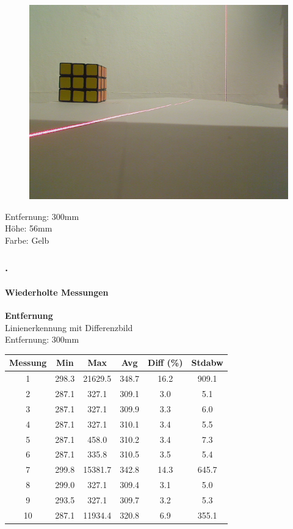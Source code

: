 \documentclass[xcolor=dvipsnames]{beamer}
\def\frametitlesec{\frametitle{\arabic{section}.\hspace{0.5ex}\insertsection}}
\def\framesubtitles#1{\framesubtitle{\hspace{3.5ex}#1}}
\begin{document}
\begin{frame}
\begin{figure}
\begin{minipage}{0.32\linewidth}
		\end{minipage}
		\hfill
		\begin{minipage}{0.32\linewidth}
			\includegraphics[width=\linewidth]{includes/test_repeat_3}
		\end{minipage}
	\end{figure}
	
	Entfernung: 300mm\\
	Höhe: 56mm\\
	Farbe: Gelb

\end{frame}
	
\begin{frame}
	\frametitlesec
	\framesubtitles{Wiederholte Messungen}
		\textbf{Entfernung}\\
	
		Linienerkennung mit Differenzbild\\
		Entfernung: 300mm
		
		\begin{tabular}{c|c|c|c|c|c}
			Messung & Min & Max & Avg & Diff (\%) & Stdabw \\ \hline
1 & 298.3 & 21629.5 & 348.7 & 16.2 & 909.1 \\
2 & 287.1 & 327.1 & 309.1 & 3.0 & 5.1 \\
3 & 287.1 & 327.1 & 309.9 & 3.3 & 6.0 \\
4 & 287.1 & 327.1 & 310.1 & 3.4 & 5.5 \\
5 & 287.1 & 458.0 & 310.2 & 3.4 & 7.3 \\
6 & 287.1 & 335.8 & 310.5 & 3.5 & 5.4 \\
7 & 299.8 & 15381.7 & 342.8 & 14.3 & 645.7 \\
8 & 299.0 & 327.1 & 309.4 & 3.1 & 5.0 \\
9 & 293.5 & 327.1 & 309.7 & 3.2 & 5.3 \\
10 & 287.1 & 11934.4 & 320.8 & 6.9 & 355.1
		\end{tabular}
		
\end{frame}
	
\end{document}
